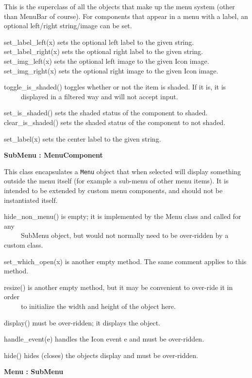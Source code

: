 This is the superclass of all the objects that make up the menu system
(other than MenuBar of course). For components that appear in a menu
with a label, an optional left/right string/image can be set.

set\_label\_left(x) sets the optional left label to the given
string.\\
set\_label\_right(x) sets the optional right label to the given
string.\\
set\_img\_left(x) sets the optional left image to the given Icon
image.\\
set\_img\_right(x) sets the optional right image to the given Icon
image.

toggle\_is\_shaded() toggles whether or not the item is shaded. If it
is, it is\\
 \ \ \ \ \ displayed in a filtered way and will not accept input.

set\_is\_shaded() sets the shaded status of the component to
shaded.\\
clear\_is\_shaded() sets the shaded status of the component to not
shaded.

set\_label(x) sets the center label to the given string.

{\sffamily\bfseries
{}SubMenu : MenuComponent}

This class encapsulates a \texttt{Menu} object that when selected will
display something outside the menu itself (for example a sub-menu of
other menu items). It is intended to be extended by custom menu
components, and should not be instantiated itself.

hide\_non\_menu() is empty; it is implemented by the Menu class and
called for any\\
 \ \ \ \ \ SubMenu object, but would not normally need to be over-ridden
by a custom class.

set\_which\_open(x) is another empty method. The same comment applies to
this method.

resize() is another empty method, but it may be convenient to over-ride
it in order\\
 \ \ \ \ \ to initialize the width and height of the object here.

display() must be over-ridden; it displays the object.

handle\_event(e) handles the Icon event e and must be over-ridden.

hide() hides (closes) the object{\textquotesingle}s display and must be
over-ridden.

{\sffamily\bfseries
{}Menu : SubMenu}

